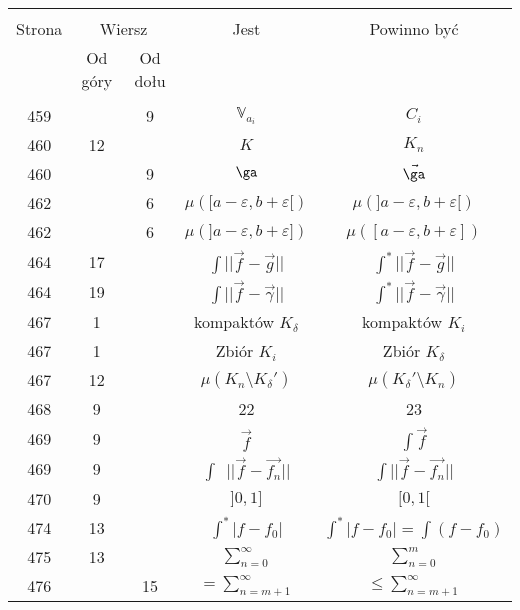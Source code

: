 \documentclass[a4paper]{article}
\newcommand{\mb}{\mathbb}
\newcommand{\V}{\mb{V}}
\newcommand{\Sum}{\sum\limits}
\newcommand{\veps}{\varepsilon}
\begin{document}
\begin{center}
  \begin{tabular}{|c|c|c|c|c|}
    \hline
    & \multicolumn{2}{c|}{} & & \\
    Strona & \multicolumn{2}{c|}{Wiersz}& Jest & Powinno być \\ \cline{2-3}
    & Od góry & Od dołu &  &  \\ \hline
    & & & & \\
    459 & & 9 & $\V_{ a_{ i } }$ & $C_{ i }$ \\
    460 & 12 & & $K$ & $K_{ n }$ \\
    460 & & 9 & $\ga$ & $\vec{ \ga }$ \\
    462 & & 6 & $\mu( [ a - \veps, b + \veps [ )$
           & $\mu( ] a - \veps, b + \veps [ )$ \\
    462 & & 6 & $\mu( ] a - \veps, b + \veps ] )$
           & $\mu( [ a - \veps, b + \veps ] )$ \\
    464 & 17 & & $\int || \vec{ f } - \vec{ g } ||$
           & $\int^{ * } || \vec{ f } - \vec{ g } ||$ \\
    464 & 19 & & $\int || \vec{ f } - \vec{ \gamma } ||$
           & $\int^{ * } || \vec{ f } - \vec{ \gamma } ||$ \\
    467 & 1 & & kompaktów $K_{ \delta }$ & kompaktów $K_{ i }$ \\
    467 & 1 & & Zbiór $K_{ i }$ & Zbiór $K_{ \delta }$ \\
    467 & 12 & & $\mu( K_{ n } \setminus K_{ \delta }' )$
           & $\mu( K_{ \delta }' \setminus K_{ n } )$ \\
    468 & 9 & & 22 & 23 \\
    469 & 9 & & $\vec{ f }$ & $\int \vec{ f }$ \\
    469 & 9 & & $\int\:\; || \vec{ f } - \vec{ f_{ n } } ||$
           & $\int || \vec{ f } - \vec{ f_{ n } } ||$ \\
    470 & 9 & & $] 0, 1 ]$ & $[ 0, 1 [$ \\
    474 & 13 & & $\int^{ * } | f - f_{ 0 } |$ & $\int^{ * } | f - f_{ 0 } |
                                                = \int ( f - f_{ 0 } )$ \\
    475 & 13 & &  $\Sum_{ n = 0 }^{ \infty }$ & $\Sum_{ n = 0 }^{ m }$ \\
    476 & & 15 & $= \Sum^{ \infty }_{ n = m + 1 }$
           & $\leq \Sum^{ \infty }_{ n = m + 1 }$ \\

\end{tabular}
\end{center}
\end{document}
